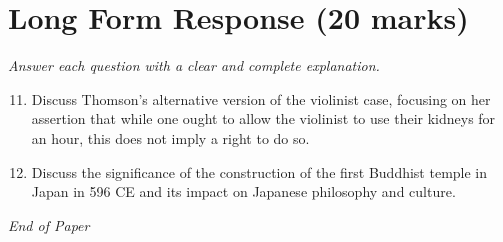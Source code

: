 \documentclass[12pt]{article}
\begin{document}
\section*{Long Form Response (20 marks)}
\textit{Answer each question with a clear and complete explanation.}
\begin{enumerate}[label=\arabic*.]
\setcounter{enumi}{10}
\item Discuss Thomson's alternative version of the violinist case, focusing on her assertion that while one ought to allow the violinist to use their kidneys for an hour, this does not imply a right to do so.
\item Discuss the significance of the construction of the first Buddhist temple in Japan in 596 CE and its impact on Japanese philosophy and culture.
\end{enumerate}

\vfill
\noindent\textit{End of Paper}
\end{document}
